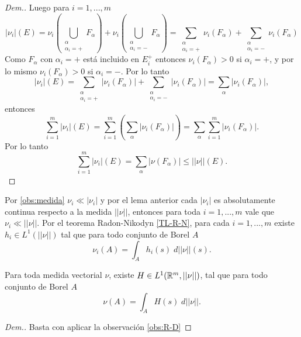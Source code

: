 \begin{proof}[Dem.]
  
  
  
  Luego para $i=1,...,m$ 
  \begin{equation*}
  	|\nu_i|(E)=\nu_i \left( \bigcup_{\substack{\alpha\\ \alpha_i=+}}F_\alpha\right) + \nu_i \left( \bigcup_{\substack{\alpha\\ \alpha_i=-}}F_\alpha\right)= \sum_{\substack{\alpha\\ \alpha_i=+}}\nu_i(F_\alpha)+\sum_{\substack{\alpha\\ \alpha_i=-}}\nu_i(F_\alpha)
  \end{equation*}
  Como $F_{\alpha}$ con $\alpha_i=+$ está incluido en $E_i^+$ entonces $\nu_i(F_\alpha)>0$ si $\alpha_i=+$, y por lo mismo $\nu_i(F_\alpha)>0$ si $\alpha_i=-$. Por lo tanto
  \begin{equation*}
  	|\nu_i|(E)= \sum_{\substack{\alpha\\ \alpha_i=+}}|\nu_i(F_\alpha)|+\sum_{\substack{\alpha\\ \alpha_i=-}}|\nu_i(F_\alpha)|=\sum_{\substack{\alpha}}|\nu_i(F_\alpha)|,
  \end{equation*}
  entonces
   \begin{equation*}
  	\sum_{i=1}^{m}|\nu_i|(E)=\sum_{i=1}^{m}\left( \sum_{\substack{\alpha}}|\nu_i(F_\alpha)|\right) = \sum_{\substack{\alpha}}\sum_{i=1}^{m}|\nu_i(F_\alpha)|.
  \end{equation*}
  Por lo tanto
  \begin{equation*}
  	\sum_{i=1}^{m}|\nu_i|(E)= \sum_{\substack{\alpha}}|\nu(F_\alpha)|\leq ||\nu||(E).
  \end{equation*}
 
\end{proof}
\begin{obs}

Por \eqref{obs:medida} $\nu_i\ll |\nu_i|$ y por el lema anterior cada $|\nu_i|$ es absolutamente continua respecto a la medida $||\nu||$, entonces para toda $i=1,..., m$ vale que $\nu_i\ll ||\nu||$.\label{obs:R-D}
	Por el teorema Radon-Nikodyn \eqref{TL-R-N}, para cada $i=1,..., m$ existe $h_i\in L^1(||\nu||) $ tal que para todo conjunto de Borel $A$
	$$\nu_i(A)=\int_A h_i(s)\;d||\nu||(s).$$
 \end{obs}
 \begin{prop}\label{prop:medida vectorial}
    Para toda medida vectorial $\nu$, existe $H\in L^1(\mathbb{R}^m,||\nu||)$, tal que para todo conjunto de Borel $A$
    \begin{equation*}
		\nu(A)=\int_A H(s)\;d||\nu||.
	\end{equation*}
 \end{prop}
\begin{proof}[Dem.]
    Basta con aplicar la observación \eqref{obs:R-D}
\end{proof}     

